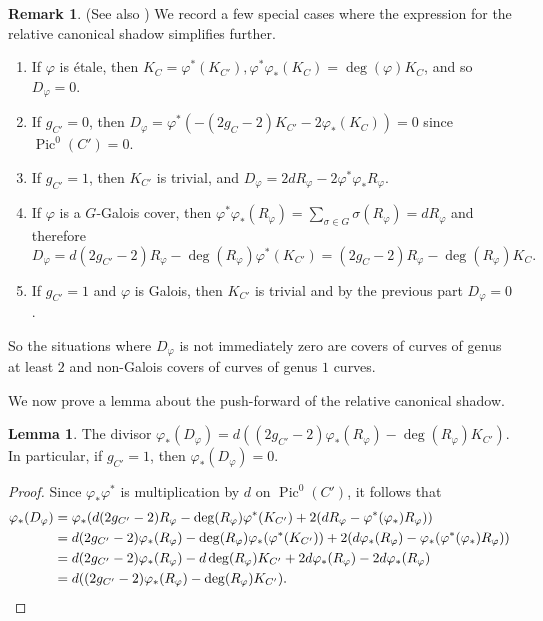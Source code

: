 \documentclass[reqno,10pt]{amsart}
\theoremstyle{definition}
\theoremstyle{definition}
\newtheorem{lem}[thm]{Lemma}
\newtheorem{rem}[thm]{Remark}
\DeclareMathOperator{\Pic}{Pic}
\begin{document}
\begin{rem}\label{rem:RCspecial} (See also \cite[Remark~18]{ELS}) We record a few special cases where the expression for the relative canonical shadow simplifies further.
\begin{enumerate}
\item If $\varphi$ is \'{e}tale, then $K_C = \varphi^*(K_{C'}), \varphi^*\varphi_*(K_C) = \deg(\varphi) K_C$, and so $D_{\varphi} = 0$.
\item If $g_{C'} = 0$, then $D_{\varphi} = \varphi^* \left( -(2g_C - 2)K_{C'} - 2\varphi_*(K_C) \right) = 0$ since $\Pic^0(C') = 0$.
\item\label{rem:gE1} If $g_{C'}=1$, then $K_{C'}$ is trivial, and
$ D_{\varphi} = 2dR_{\varphi}-2\varphi^*\varphi_*R_{\varphi}$. 
\item\label{rem:Gal} If $\varphi$ is a $G$-Galois cover, then $\varphi^*\varphi_*(R_{\varphi}) = \sum_{\sigma \in G} \sigma(R_{\varphi})=dR_{\varphi}$ and therefore \[D_{\varphi} = d (2g_{C'}-2)R_{\varphi}-\deg(R_{\varphi}) \varphi^{*}(K_{C'}) = (2g_C-2)R_{\varphi} - \deg(R_{\varphi}) K_C.\] 
\item\label{rem:GalE} If $g_{C'} = 1$ and $\varphi$ is Galois, then $K_{C'}$ is trivial and by the previous part $D_{\varphi} = 0$.
\end{enumerate}
So the situations where $D_{\varphi}$ is not immediately zero are covers of curves of genus at least $2$  
and non-Galois covers of curves of genus $1$ curves. 
\end{rem}

 We now prove a lemma about the push-forward of the  relative canonical shadow.
 \begin{lem}\label{lem:relcanpush}
The divisor $\varphi_*(D_{\varphi}) = d ((2g_{C'}-2) \varphi_*(R_{\varphi})-\deg(R_{\varphi}) K_{C'}).$ In particular, if $g_{C'} = 1$, then  $\varphi_*(D_{\varphi}) = 0$.
\end{lem}
\begin{proof} 
Since $\varphi_* \varphi^*$ is multiplication by $d$ on $\Pic^0(C')$, it follows that
\begin{align}\label{E:ShPush}
\begin{split}
\varphi_*(D_{\varphi}) &= \varphi_*(d (2g_{C'}-2)R_{\varphi}-\deg(R_{\varphi}) \varphi^{*}(K_{C'}) + 2(dR_{\varphi}-\varphi^{*}(\varphi_*)R_{\varphi})) \\
&=d (2g_{C'}-2) \varphi_*(R_{\varphi})-\deg(R_{\varphi}) \varphi_*(\varphi^{*}(K_{C'})) + 2(d \varphi_*(R_{\varphi})-\varphi_*(\varphi^{*}(\varphi_*)R_{\varphi})) \\
&= d (2g_{C'}-2) \varphi_*(R_{\varphi})-d\deg(R_{\varphi}) K_{C'} + 2d \varphi_*(R_{\varphi})-2d\varphi_*(R_{\varphi}) \\
&= d ((2g_{C'}-2) \varphi_*(R_{\varphi})-\deg(R_{\varphi}) K_{C'}).\qedhere
\end{split}
\end{align}
\end{proof}
\end{document}
